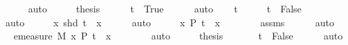 \begin{isabellebody}
\ \ \ \ \isamarkupfalse%
\ auto\isanewline
\ \ \isamarkupfalse%
\ \isamarkupfalse%
\ {\isacharquery}{\kern0pt}thesis\isanewline
\ \ \ \ \isamarkupfalse%
\ {\isacartoucheopen}t\ {\isacharequal}{\kern0pt}\ True{\isacartoucheclose}\isanewline
\ \ \ \ \isamarkupfalse%
\ auto\isanewline
{}\isamarkupfalse%
\isanewline
\ \ \isamarkupfalse%
\ {\isachardoublequoteopen}{\isasymnot}t{\isachardoublequoteclose}\isanewline
\ \ \isamarkupfalse%
\ \isamarkupfalse%
\ {\isachardoublequoteopen}t\ {\isacharequal}{\kern0pt}\ False{\isachardoublequoteclose}\isanewline
\ \ \ \ \isamarkupfalse%
\ auto\isanewline
\ \ \isamarkupfalse%
\ \isamarkupfalse%
\ {\isachardoublequoteopen}{\isasymforall}x{\isachardot}{\kern0pt}\ {\isasymnot}shd\ {\isacharparenleft}{\kern0pt}t\ {\isacharhash}{\kern0pt}{\isacharhash}{\kern0pt}\ x{\isacharparenright}{\kern0pt}{\isachardoublequoteclose}\isanewline
\ \ \ \ \isamarkupfalse%
\ auto\isanewline
\ \ \isamarkupfalse%
\ \isamarkupfalse%
\ {\isachardoublequoteopen}{\isacharbraceleft}{\kern0pt}x{\isachardot}{\kern0pt}\ P\ {\isacharparenleft}{\kern0pt}t\ {\isacharhash}{\kern0pt}{\isacharhash}{\kern0pt}\ x{\isacharparenright}{\kern0pt}{\isacharbraceright}{\kern0pt}\ {\isacharequal}{\kern0pt}\ {\isacharbraceleft}{\kern0pt}{\isacharbraceright}{\kern0pt}{\isachardoublequoteclose}\isanewline
\ \ \ \ \isamarkupfalse%
\ assms{\isacharparenleft}{\kern0pt}{}{\isacharparenright}{\kern0pt}\isanewline
\ \ \ \ \isamarkupfalse%
\ auto\isanewline
\ \ \isamarkupfalse%
\ \isamarkupfalse%
\ {\isachardoublequoteopen}emeasure\ M\ {\isacharbraceleft}{\kern0pt}x{\isachardot}{\kern0pt}\ P\ {\isacharparenleft}{\kern0pt}t\ {\isacharhash}{\kern0pt}{\isacharhash}{\kern0pt}\ x{\isacharparenright}{\kern0pt}{\isacharbraceright}{\kern0pt}\ {\isacharequal}{\kern0pt}\ {}{\isachardoublequoteclose}\isanewline
\ \ \ \ \isamarkupfalse%
\ auto\isanewline
\ \ \isamarkupfalse%
\ \isamarkupfalse%
\ {\isacharquery}{\kern0pt}thesis\ \isanewline
\ \ \ \ \isamarkupfalse%
\ {\isacartoucheopen}t\ {\isacharequal}{\kern0pt}\ False{\isacartoucheclose}\isanewline
\ \ \ \ \isamarkupfalse%
\ auto\isanewline
{}\isamarkupfalse%
%
\endisatagproof
{\isafoldproof}%
%
\isadelimproof
\isanewline

\end{isabellebody}
